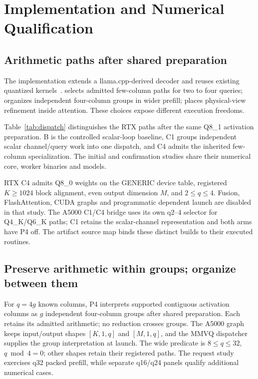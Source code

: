 \section{Implementation and Numerical Qualification}
\label{sec:implementation}

\subsection{Arithmetic paths after shared preparation}
The implementation extends a llama.cpp-derived decoder and reuses existing quantized kernels~\cite{llama_cpp_fewrow,loop4code}. \Cfour{} selects admitted few-column paths for two to four queries; \Pfour{} organizes independent four-column groups in wider prefill; \Local{} places physical-view refinement inside attention. These choices expose different execution freedoms.

Table~\ref{tab:dispatch} distinguishes the RTX paths after the same Q8\_1 activation preparation. B is the controlled scalar-loop baseline, C1 groups independent scalar channel/query work into one dispatch, and C4 admits the inherited few-column specialization. The initial and confirmation studies share their numerical core, worker binaries and models.


RTX C4 admits Q8\_0 weights on the GENERIC device table, registered $K\geq1024$ block alignment, even output dimension $M$, and $2\leq q\leq4$. Fusion, FlashAttention, CUDA graphs and programmatic dependent launch are disabled in that study. The A5000 C1/C4 bridge uses its own q2--4 selector for Q4\_K/Q6\_K paths; C1 retains the scalar-channel representation and both arms have P4 off. The artifact source map binds these distinct builds to their executed routines.

\subsection{Preserve arithmetic within groups; organize between them}
For $q=4g$ known columns, P4 interprets supported contiguous activation columns as $g$ independent four-column groups after shared preparation. Each retains its admitted arithmetic; no reduction crosses groups. The A5000 graph keeps input/output shapes $[K,1,q]$ and $[M,1,q]$, and the MMVQ dispatcher supplies the group interpretation at launch. The wide predicate is $8\leq q\leq32$, \mbox{$q\bmod4=0$}; other shapes retain their registered paths. The request study exercises q32 packed prefill, while separate q16/q24 panels qualify additional numerical cases.


